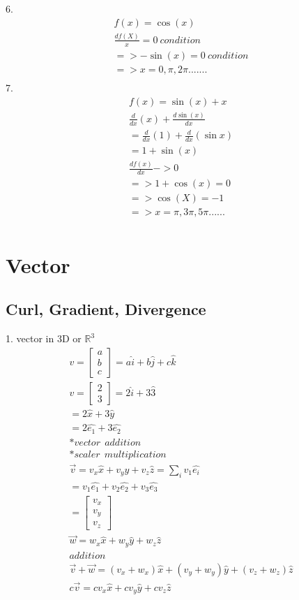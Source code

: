 	6.
	\begin{align}
		f(x) = \cos(x) \\
		\frac{df(X)}{x} = 0 \ condition \\
		=> -\sin(x) = 0 \ condition \\
		=> x = 0, \pi,2\pi .......\\
	\end{align}
	7.
	\begin{align}
		f(x) = \sin(x)+x \\
		\frac{d}{dx}(x)+\frac{d\sin(x)}{dx} \\
		= \frac{d}{dx}(1) + \frac{d}{dx}(\sin x) \\
		= 1 + \sin(x) \\
		\frac{df(x)}{dx} ->0 \\
		=>1+\cos(x) = 0 \\
		=>\cos(X) = -1 \\
		=> x = \pi,3\pi,5\pi ...... \\
	\end{align}
		

\section{Vector}	

\subsection{Curl, Gradient, Divergence}
	1. vector in 3D or $\mathbb{R}^3$
	\begin{align}
		v = 
		\begin{bmatrix}
			a \\
			b \\
			c
		\end{bmatrix}
		= a\hat{i} + b\hat{j} + c\hat{k} \\
		v = \begin{bmatrix}
			2 \\
			3
		\end{bmatrix}
		= 2\hat{i} + 3\hat{3} \\
		=2\hat{x} + 3\hat{y} \\
		=2\hat{e_1} + 3\hat{e_2} \\
		* vector \ \ addition \\
		* scaler \ \ multiplication \\
		\vec{v} = v_x \hat{x} + v_y \hat{y} + v_z \hat{z} = \sum_{i}^{} v_1 \hat{e_i} \\
		= v_1 \hat{e_1} + v_2\hat{e_2} + v_3\hat{e_3} \\
		=\begin{bmatrix}
			v_x \\
			v_y \\
			v_z
		\end{bmatrix} \\
		\vec{w} = w_x \hat{x} + w_y \hat{y} + w_z \hat{z} \\
		addition \\
		\vec{v} + \vec{w} = (v_x+w_x)\hat{x} + (v_y+w_y)\hat{y}+(v_z+w_z)\hat{z} \\
		c\vec{v} = cv_x \hat{x}+ cv_y\hat{y}+cv_z\hat{z}
	\end{align}



